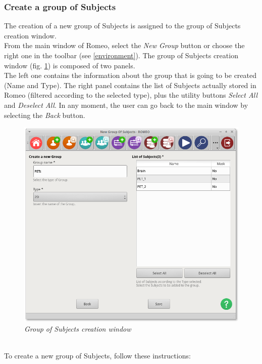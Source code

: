 \subsubsection{Create a group of Subjects}
\label{creategroup}
The creation of a new group of Subjects\g{} is assigned to the group of Subjects\g{} creation window.\\
From the main window of Romeo, select the \textit{New Group} button or choose the right one in the toolbar (see \ref{environment}). The group of Subjects\g{} creation window (fig. \ref{creategroupimg}) is composed of two panels.\\
The left one contains the information about the group that is going to be created (Name and Type). The right panel contains the list of Subjects\g{} actually stored in Romeo (filtered according to the selected type), plus the utility buttons \textit{Select All} and \textit{Deselect All}. In any moment, the user can go back to the main window by selecting the \textit{Back} button.
\begin{figure}[!h]
\begin{center}
\includegraphics[scale=0.4]{./Images/NewGroupView}
\caption{\textit{Group of Subjects creation window}}
\label{creategroupimg}
\end{center}
\end{figure}
\pagebreak
\\To create a new group of Subjects\g{}, follow these instructions:
